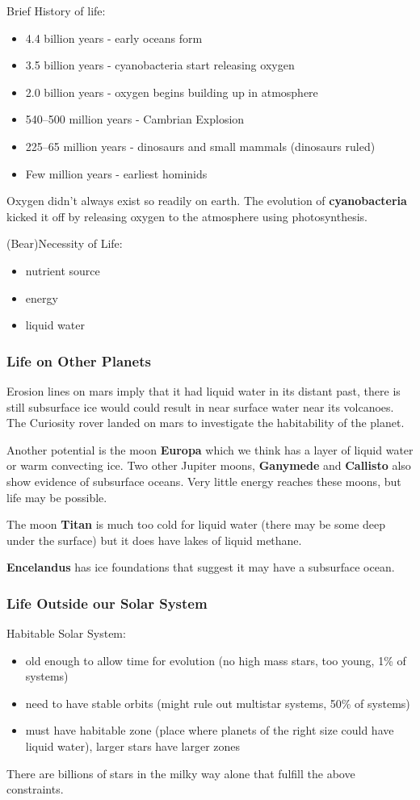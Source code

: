 \documentclass[12pt]{article}
\begin{document}
Brief History of life:
\begin{itemize}
    \item 4.4 billion years - early oceans form
    \item 3.5 billion years - cyanobacteria start releasing oxygen
    \item 2.0 billion years - oxygen begins building up in atmosphere
    \item 540–500 million years - Cambrian Explosion
    \item 225–65 million years - dinosaurs and small mammals (dinosaurs ruled)
    \item Few million years - earliest hominids
\end{itemize}

Oxygen didn't always exist so readily on earth. The evolution of \textbf{cyanobacteria} kicked it off by releasing oxygen to the atmosphere using photosynthesis.

(Bear)Necessity of Life:
\begin{itemize}
    \item nutrient source
    \item energy
    \item liquid water
\end{itemize}

\subsubsection{Life on Other Planets}
Erosion lines on mars imply that it had liquid water in its distant past, there is still subsurface ice would could result in near surface water near its volcanoes. The Curiosity rover landed on mars to investigate the habitability of the planet.

Another potential is the moon \textbf{Europa} which we think has a layer of liquid water or warm convecting ice. Two other Jupiter moons, \textbf{Ganymede} and \textbf{Callisto} also show evidence of subsurface oceans. Very little energy reaches these moons, but life may be possible.

The moon \textbf{Titan} is much too cold for liquid water (there may be some deep under the surface) but it does have lakes of liquid methane.

\textbf{Encelandus} has ice foundations that suggest it may have a subsurface ocean.

\subsubsection{Life Outside our Solar System}
Habitable Solar System:
\begin{itemize}
    \item old enough to allow time for evolution (no high mass stars, too young, 1\% of systems)
    \item need to have stable orbits (might rule out multistar systems, 50\% of systems)
    \item must have habitable zone (place where planets of the right size could have liquid water), larger stars have larger zones
\end{itemize}
There are billions of stars in the milky way alone that fulfill the above constraints.
\end{document}
